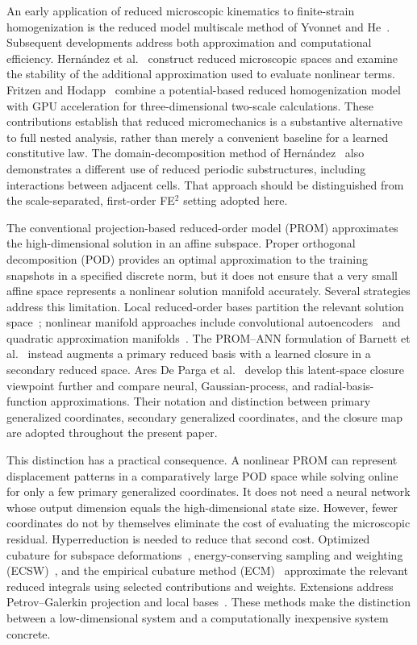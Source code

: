 An early application of reduced microscopic kinematics to finite-strain homogenization is the reduced model multiscale method of Yvonnet and He~\cite{yvonnet2007}. Subsequent developments address both approximation and computational efficiency. Hern\'andez et al.~\cite{Hernandez2014} construct reduced microscopic spaces and examine the stability of the additional approximation used to evaluate nonlinear terms. Fritzen and Hodapp~\cite{Fritzen2016} combine a potential-based reduced homogenization model with GPU acceleration for three-dimensional two-scale calculations. These contributions establish that reduced micromechanics is a substantive alternative to full nested analysis, rather than merely a convenient baseline for a learned constitutive law. The domain-decomposition method of Hern\'andez~\cite{Hernandez2020} also demonstrates a different use of reduced periodic substructures, including interactions between adjacent cells. That approach should be distinguished from the scale-separated, first-order FE$^2$ setting adopted here.

The conventional projection-based reduced-order model (PROM) approximates the high-dimensional solution in an affine subspace. Proper orthogonal decomposition (POD) provides an optimal approximation to the training snapshots in a specified discrete norm, but it does not ensure that a very small affine space represents a nonlinear solution manifold accurately. Several strategies address this limitation. Local reduced-order bases partition the relevant solution space~\cite{Amsallem2012}; nonlinear manifold approaches include convolutional autoencoders~\cite{Lee2020} and quadratic approximation manifolds~\cite{Barnett2022}. The PROM--ANN formulation of Barnett et al.~\cite{barnett2023} instead augments a primary reduced basis with a learned closure in a secondary reduced space. Ares De Parga et al.~\cite{aresdeparga2026nonlinear} develop this latent-space closure viewpoint further and compare neural, Gaussian-process, and radial-basis-function approximations. Their notation and distinction between primary generalized coordinates, secondary generalized coordinates, and the closure map are adopted throughout the present paper.

This distinction has a practical consequence. A nonlinear PROM can represent displacement patterns in a comparatively large POD space while solving online for only a few primary generalized coordinates. It does not need a neural network whose output dimension equals the high-dimensional state size. However, fewer coordinates do not by themselves eliminate the cost of evaluating the microscopic residual. Hyperreduction is needed to reduce that second cost. Optimized cubature for subspace deformations~\cite{An2008}, energy-conserving sampling and weighting (ECSW)~\cite{Farhat2014,farhat2015}, and the empirical cubature method (ECM)~\cite{hernandez2017} approximate the relevant reduced integrals using selected contributions and weights. Extensions address Petrov--Galerkin projection and local bases~\cite{Grimberg2021,AresDeParga2023}. These methods make the distinction between a low-dimensional system and a computationally inexpensive system concrete.

